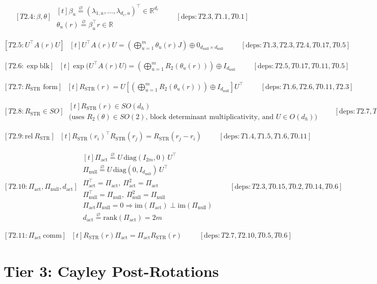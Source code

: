 \documentclass[11pt]{article}
\newcommand{\eqdef}{\overset{\varnothing}{=}}
\newcommand{\ProofBlock}[3]{%
  \begin{equation*}
    \boxed{[#1]}\;
    \begin{aligned}[t]
      #2
    \end{aligned}
    \qquad [\mathrm{deps}: #3]
  \end{equation*}
}
\newcommand{\Note}[1]{\text{(#1)}}
\newcommand{\Real}{\mathbb{R}}
\begin{document}
\ProofBlock{T2.4:\beta,\theta}{
\beta_u \eqdef (\lambda_{1,u},\dots,\lambda_{d_c,u})^\top \in \Real^{d_c}\\
\theta_u(r) \eqdef \beta_u^\top r \in \Real
}{T2.3,T1.1,T0.1}

\ProofBlock{T2.5:U^\top A(r)U}{
U^\top A(r) U = \left(\bigoplus_{u=1}^m \theta_u(r) J\right)\oplus 0_{d_{\mathrm{null}}\times d_{\mathrm{null}}}
}{T1.3,T2.3,T2.4,T0.17,T0.5}

\ProofBlock{T2.6:\exp\mathrm{blk}}{
\exp\!\big(U^\top A(r) U\big)
 = \left(\bigoplus_{u=1}^m R_2(\theta_u(r))\right)\oplus I_{d_{\mathrm{null}}}
}{T2.5,T0.17,T0.11,T0.5}

\ProofBlock{T2.7:R_{\mathrm{STR}}\text{ form}}{
R_{\mathrm{STR}}(r)
 = U\left[\left(\bigoplus_{u=1}^m R_2(\theta_u(r))\right)\oplus I_{d_{\mathrm{null}}}\right]U^\top
}{T1.6,T2.6,T0.11,T2.3}

\ProofBlock{T2.8:R_{\mathrm{STR}}\in SO}{
R_{\mathrm{STR}}(r)\in SO(d_h)\\
\Note{uses $R_2(\theta)\in SO(2)$, block determinant multiplicativity, and $U\in O(d_h)$}
}{T2.7,T0.18,T0.5,T2.3,T0.6,T0.7,T0.4}

\ProofBlock{T2.9:\mathrm{rel}\ R_{\mathrm{STR}}}{
R_{\mathrm{STR}}(r_i)^\top R_{\mathrm{STR}}(r_j) = R_{\mathrm{STR}}(r_j-r_i)
}{T1.4,T1.5,T1.6,T0.11}

\ProofBlock{T2.10:\Pi_{\mathrm{act}},\Pi_{\mathrm{null}},d_{\mathrm{act}}}{
\Pi_{\mathrm{act}} \eqdef U\,\mathrm{diag}(I_{2m},0)\,U^\top\\
\Pi_{\mathrm{null}} \eqdef U\,\mathrm{diag}(0,I_{d_{\mathrm{null}}})\,U^\top\\
\Pi_{\mathrm{act}}^\top = \Pi_{\mathrm{act}},\ \Pi_{\mathrm{act}}^2 = \Pi_{\mathrm{act}}\\
\Pi_{\mathrm{null}}^\top = \Pi_{\mathrm{null}},\ \Pi_{\mathrm{null}}^2 = \Pi_{\mathrm{null}}\\
\Pi_{\mathrm{act}}\Pi_{\mathrm{null}} = 0 \Rightarrow \mathrm{im}(\Pi_{\mathrm{act}})\perp \mathrm{im}(\Pi_{\mathrm{null}})\\
d_{\mathrm{act}} \eqdef \mathrm{rank}(\Pi_{\mathrm{act}}) = 2m
}{T2.3,T0.15,T0.2,T0.14,T0.6}

\ProofBlock{T2.11:\Pi_{\mathrm{act}}\ \mathrm{comm}}{
R_{\mathrm{STR}}(r)\Pi_{\mathrm{act}} = \Pi_{\mathrm{act}} R_{\mathrm{STR}}(r)
}{T2.7,T2.10,T0.5,T0.6}

\section{Tier 3: Cayley Post-Rotations}
\end{document}

